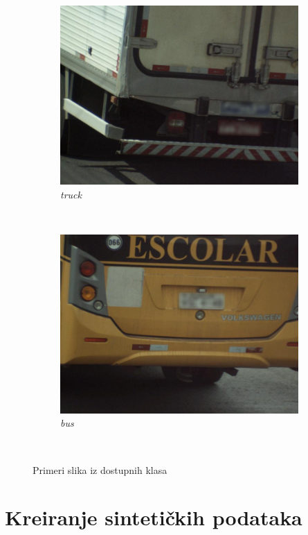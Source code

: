 \documentclass[12pt,oneside]{memoir}
\begin{document}
\begin{figure}
\begin{subfigure}[b]{0.48\textwidth}
        \includegraphics[width=\textwidth]{matfmaster/glava3/truck.jpg}
        \caption{\textit{truck}}
        \label{fig:section3_truck}
    \end{subfigure}
    ~
    \begin{subfigure}[b]{0.48\textwidth}
        \includegraphics[width=\textwidth]{matfmaster/glava3/bus.jpg}
        \caption{\textit{bus}}
        \label{fig:section3_bus}
    \end{subfigure}
    ~
    \caption{Primeri slika iz dostupnih klasa}\label{fig:section3_allclasses}
\end{figure}


\section{Kreiranje sintetičkih podataka}
\end{document}
